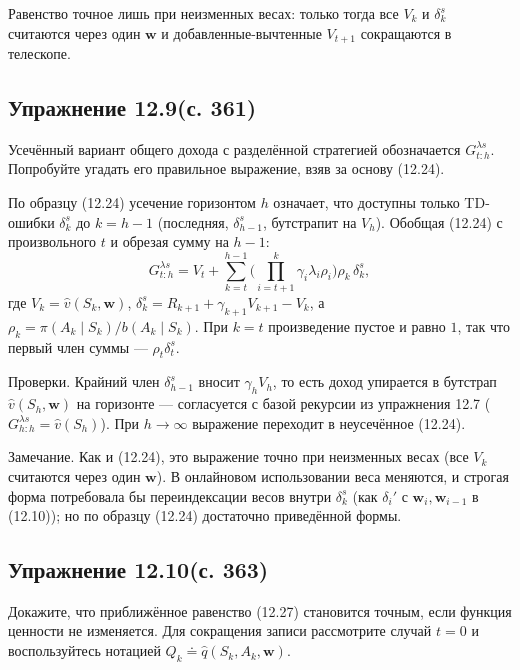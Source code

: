 \begin{solution}
    Равенство точное лишь при неизменных весах: только тогда все $V_k$ и
    $\delta_k^s$ считаются через один $\mathbf w$ и добавленные-вычтенные $V_{t+1}$
    сокращаются в телескопе.
\end{solution}

\subsection{Упражнение 12.9(с. 361)}
Усечённый вариант общего дохода с разделённой стратегией обозначается
$G_{t:h}^{\lambda s}$. Попробуйте угадать его правильное выражение, взяв за основу
(12.24).

\begin{solution}
    По образцу (12.24) усечение горизонтом $h$ означает, что доступны только
    TD-ошибки $\delta_k^s$ до $k=h-1$ (последняя, $\delta_{h-1}^s$, бутстрапит на
    $V_h$). Обобщая (12.24) с произвольного $t$ и обрезая сумму на $h-1$:
    \begin{equation*}
        G_{t:h}^{\lambda s} = V_t + \sum_{k=t}^{h-1}\Big(\prod_{i=t+1}^{k}\gamma_i\lambda_i\rho_i\Big)\rho_k\,\delta_k^s,
    \end{equation*}
    где $V_k = \hat v(S_k,\mathbf w)$, $\delta_k^s = R_{k+1} + \gamma_{k+1}V_{k+1} - V_k$,
    а $\rho_k = \pi(A_k\mid S_k)/b(A_k\mid S_k)$. При $k=t$ произведение пустое и
    равно $1$, так что первый член суммы --- $\rho_t\delta_t^s$.

    Проверки. Крайний член $\delta_{h-1}^s$ вносит $\gamma_h V_h$, то есть доход
    упирается в бутстрап $\hat v(S_h,\mathbf w)$ на горизонте --- согласуется с
    базой рекурсии из упражнения 12.7 ($G_{h:h}^{\lambda s}=\hat v(S_h)$). При
    $h\to\infty$ выражение переходит в неусечённое (12.24).

    Замечание. Как и (12.24), это выражение точно при неизменных весах (все $V_k$
    считаются через один $\mathbf w$). В онлайновом использовании веса меняются, и
    строгая форма потребовала бы переиндексации весов внутри $\delta_k^s$ (как
    $\delta_i'$ с $\mathbf w_i,\mathbf w_{i-1}$ в (12.10)); но по образцу (12.24)
    достаточно приведённой формы.
\end{solution}

\subsection{Упражнение 12.10(с. 363)}
Докажите, что приближённое равенство (12.27) становится точным, если функция
ценности не изменяется. Для сокращения записи рассмотрите случай $t=0$ и
воспользуйтесь нотацией $Q_k \doteq \hat q(S_k,A_k,\mathbf w)$.

